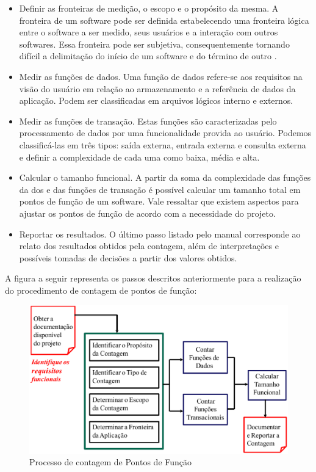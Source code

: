 \begin{itemize}

	\item Definir as fronteiras de medição, o escopo e o propósito da mesma. A fronteira de um software pode ser definida estabelecendo uma fronteira lógica entre o software a ser medido, seus usuários e a interação com outros softwares. Essa fronteira pode ser subjetiva, consequentemente tornando difícil a delimitação do início de um software e do término de outro \cite{Marcos:2015}.

	\item Medir as funções de dados. Uma função de dados refere-se aos requisitos na visão do usuário em relação ao armazenamento e a referência de dados da aplicação. Podem ser classificadas em arquivos lógicos interno e externos.

	\item Medir as funções de transação. Estas funções são caracterizadas pelo processamento de dados por uma funcionalidade provida ao usuário. Podemos classificá-las em três tipos: saída externa, entrada externa e consulta externa e definir a complexidade de cada uma como baixa, média e alta.

	\item Calcular o tamanho funcional. A partir da soma da complexidade das funções da dos e das funções de transação é possível calcular um tamanho total em pontos de função de um software. Vale ressaltar que existem aspectos para ajustar os pontos de função de acordo com a necessidade do projeto.

	\item Reportar os resultados. O último passo listado pelo manual corresponde ao relato dos resultados obtidos pela contagem, além de interpretações e possíveis tomadas de decisões a partir dos valores obtidos.

\end{itemize}

A figura a seguir representa os passos descritos anteriormente para a realização do procedimento de contagem de pontos de função:

\begin{figure}[h]
	\centering
	\label{fig05}
	\includegraphics[keepaspectratio=true,scale=0.4]{figuras/fig05.eps}
	\caption{Processo de contagem de Pontos de Função \cite{SISP:2016}}
\end{figure}



